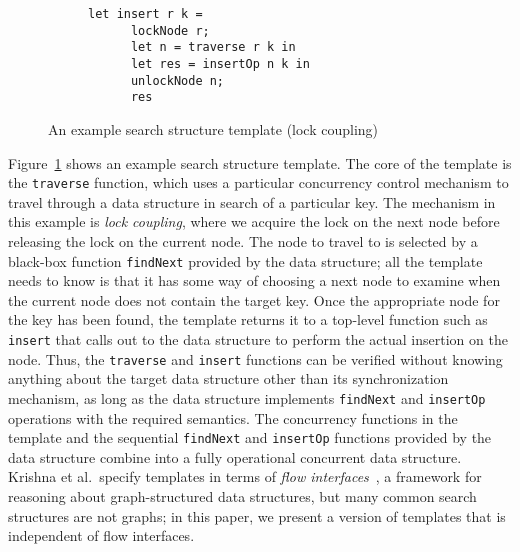 \documentclass[a4paper,UKenglish,cleveref, autoref, thm-restate]{lipics-v2021}
\begin{document}
\begin{figure}[h]
	\begin{subfigure}[t]{0.45\textwidth}
		 
	\end{subfigure}\qquad
	\begin{subfigure}[t]{0.48\textwidth}
	\begin{lstlisting}[language=caml, style=myStyle]
	let insert r k =
	  lockNode r;
	  let n = traverse r k in
	  let res = insertOp n k in
	  unlockNode n; 
	  res\end{lstlisting}
	\end{subfigure}
	\caption{An example search structure template (lock coupling)}
	\label{template-ex}
\end{figure}

Figure~\ref{template-ex} shows an example search structure template. The core of the template is the \lstinline{traverse} function, which uses a particular concurrency control mechanism to travel through a data structure in search of a particular key. The mechanism in this example is \emph{lock coupling}, where we acquire the lock on the next node before releasing the lock on the current node. The node to travel to is selected by a black-box function \lstinline{findNext} provided by the data structure; all the template needs to know is that it has some way of choosing a next node to examine when the current node does not contain the target key. Once the appropriate node for the key has been found, the template returns it to a top-level function such as \lstinline{insert} that calls out to the data structure to perform the actual insertion on the node. Thus, the \lstinline{traverse} and \lstinline{insert} functions can be verified without knowing anything about the target data structure other than its synchronization mechanism, as long as the data structure implements \lstinline{findNext} and \lstinline{insertOp} operations with the required semantics. The concurrency functions in the template and the sequential \lstinline{findNext} and \lstinline{insertOp} functions provided by the data structure combine into a fully operational concurrent data structure. Krishna et al.~specify templates in terms of \emph{flow interfaces}~\cite{krishna2017flow}, a framework for reasoning about graph-structured data structures, but many common search structures are not graphs; in this paper, we present a version of templates that is independent of flow interfaces. %
\end{document}
